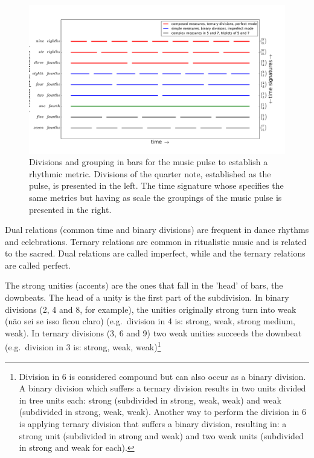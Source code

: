 \documentclass[
 aip,
 jmp,
 amsmath,amssymb,
 reprint,
]{revtex4-1}
\begin{document}
\begin{figure}[h!]
    \centering
        \includegraphics[width=\columnwidth]{figures/metricaMusical}
    \caption{Divisions and grouping in bars for the music pulse to establish a rhythmic
        metric. Divisions of the quarter note, established as the
        pulse, is presented in the left. The time signature whose specifies the same
        metrics but having as scale the groupings of the music pulse is presented in the right.}
        \label{fig:pulsoSubAgl}
\end{figure}

Dual relations (common time and binary divisions) are frequent in dance rhythms
and celebrations. Ternary relations are common in
ritualistic music and is related to the sacred. Dual relations are called imperfect, while and the ternary relations are called perfect.

The strong unities (accents) are the ones that fall in the 'head' of bars, the downbeats. The
head of a unity is the first part of the subdivision. In binary divisions (2, 4
and 8, for example), the unities originally strong turn into weak (não sei se isso ficou claro)
(e.g.\ division in 4 is: strong, weak, strong medium, weak). In ternary divisions
(3, 6 and 9) two weak unities succeeds the downbeat (e.g.\ division in 3 is:
strong, weak, weak)\footnote{Division in 6 is considered compound but can also
occur as a binary division. A binary division which suffers a ternary division
results in two units divided in tree units each: strong (subdivided in strong,
weak, weak) and weak (subdivided in strong, weak, weak). Another way to perform
the division in 6 is applying ternary division that suffers a binary division,
resulting in: a strong unit (subdivided in strong and weak) and two weak units
(subdivided in strong and weak for each).}
\end{document}
